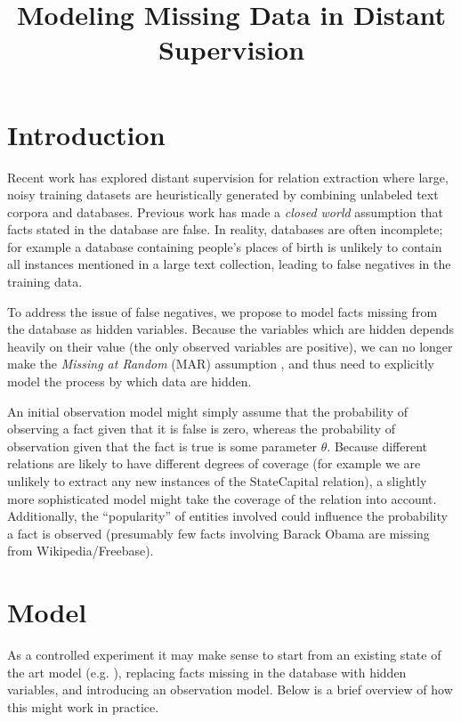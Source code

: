 \documentclass[12pt]{article}
\begin{document}
\date{}
\title{Modeling Missing Data in Distant Supervision}
\author{}
\maketitle



\section{Introduction}
Recent work has explored distant supervision for relation extraction \citep{mintz09,Hoffmann11} where large, noisy training datasets are heuristically
generated by combining unlabeled text corpora and databases.  Previous work has made a \emph{closed world} assumption that facts
stated in the database are false.  In reality, databases are often incomplete; for example a database containing people's places of birth 
is unlikely to contain all instances mentioned in a large text collection, leading to false negatives in
the training data.

To address the issue of false negatives, we propose to model facts missing from the database as hidden variables.  Because the variables which
are hidden depends heavily on their value (the only observed variables are positive), we can no longer make the
\emph{Missing at Random} (MAR) assumption \citep{Schafer02}, and thus need to explicitly model the process by which data are hidden.

An initial observation model might simply assume that the probability of observing a fact given that it is false is zero, whereas
the probability of observation given that the fact is true is some parameter $\theta$.  Because different relations are likely
to have different degrees of coverage (for example we are unlikely to extract any new instances of the {\sc StateCapital} relation),
a slightly more sophisticated model might take the coverage of the relation into account.  Additionally, the ``popularity'' of 
entities involved could influence the probability a fact is observed (presumably few facts involving Barack Obama are missing from
Wikipedia/Freebase).

\section{Model}
As a controlled experiment it may make sense to start from an existing state of the art model (e.g. \cite{Hoffmann11}), replacing
facts missing in the database with hidden variables, and introducing an observation model.  Below is a brief overview of how this might work in practice.
\end{document}
